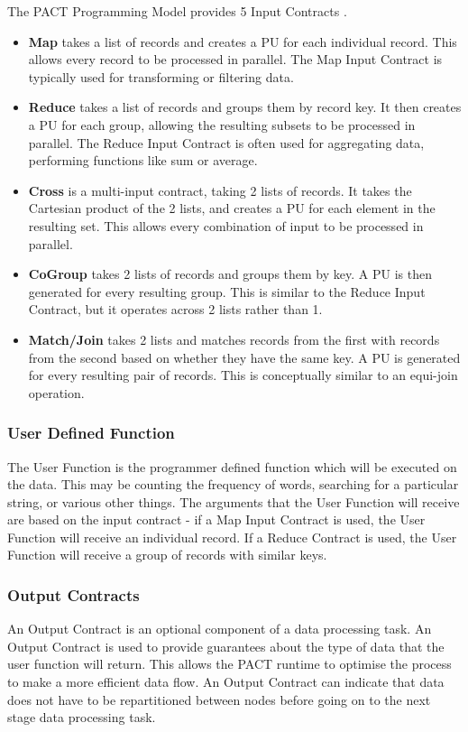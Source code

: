 The PACT Programming Model provides 5 Input Contracts \cite{alexandrov2010massively}.

\begin{itemize}
    \item \textbf{Map} takes a list of records and creates a PU for each individual record. This allows every record to be processed in parallel. The Map Input Contract is typically used for transforming or filtering data.
    \item \textbf{Reduce} takes a list of records and groups them by record key. It then creates a PU for each group, allowing the resulting subsets to be processed in parallel. The Reduce Input Contract is often used for aggregating data, performing functions like sum or average.
    \item \textbf{Cross} is a multi-input contract, taking 2 lists of records. It takes the Cartesian product of the 2 lists, and creates a PU for each element in the resulting set. This allows every combination of input to be processed in parallel.
    \item \textbf{CoGroup} takes 2 lists of records and groups them by key. A PU is then generated for every resulting group. This is similar to the Reduce Input Contract, but it operates across 2 lists rather than 1.
    \item \textbf{Match/Join} takes 2 lists and matches records from the first with records from the second based on whether they have the same key. A PU is generated for every resulting pair of records. This is conceptually similar to an equi-join operation.
\end{itemize}

\subsubsection{User Defined Function}
The User Function is the programmer defined function which will be executed on the data. This may be counting the frequency of words, searching for a particular string, or various other things. The arguments that the User Function will receive are based on the input contract - if a Map Input Contract is used, the User Function will receive an individual record. If a Reduce Contract is used, the User Function will receive a group of records with similar keys.

\subsubsection{Output Contracts}
An Output Contract is an optional component of a data processing task. An Output Contract is used to provide guarantees about the type of data that the user function will return. This allows the PACT runtime to optimise the process to make a more efficient data flow. An Output Contract can indicate that data does not have to be repartitioned between nodes before going on to the next stage data processing task. 


